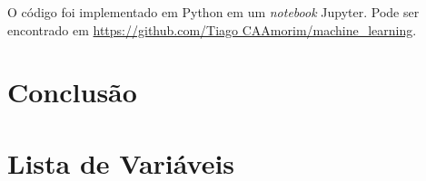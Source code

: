 \documentclass[final,5p]{elsarticle}
\numberwithin{equation}{section}
\begin{document}
        O código foi implementado em Python em um \emph{notebook} Jupyter. Pode ser encontrado em \href{https://github.com/TiagoCAAmorim/machine_learning/blob/main/Lista01/Lista01.ipynb}{https://github.com/Tiago CAAmorim/machine\_learning}.

\section{Conclusão}




\appendix

\section{Lista de Variáveis}
\end{document}
